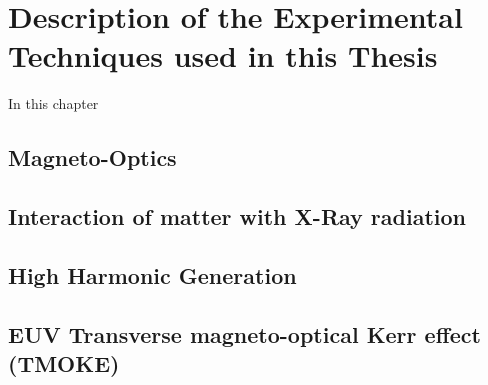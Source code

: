 \chapter{Description of the Experimental Techniques used in this Thesis}

In this chapter 

\section{Magneto-Optics}

\section{Interaction of matter with X-Ray radiation}

\section{High Harmonic Generation}

\section{EUV Transverse magneto-optical Kerr effect (TMOKE)}
